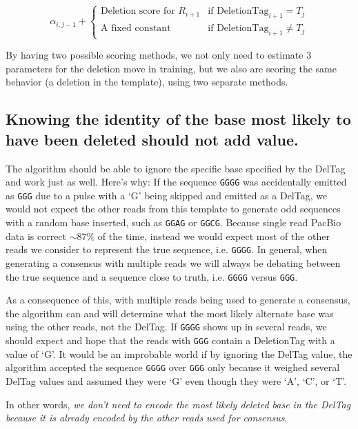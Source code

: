 \documentclass[fleqn,10pt]{SelfArx} %
\begin{document}
\[
	\alpha_{i,j-1}  +  \begin{cases}
							 \text{Deletion score  for } R_{i+1}  & \text{if }  \text{DeletionTag}_{i+1} = T_{j} \\
							 \text{A fixed constant} & \text{if }  \text{DeletionTag}_{i+1} \neq T_{j} 
							 \end{cases}
\]

By having two possible scoring methods, we not only need to estimate 3 parameters for the deletion move in training, but we also are scoring the same behavior (a deletion in the template), using two separate methods.

\subsection{Knowing the identity of the base most likely to have been deleted should not add value.}

The algorithm should be able to ignore the specific base specified by the DelTag and work just as well.  Here's why: If the sequence \texttt{GGGG} was accidentally emitted as \texttt{GGG} due to a pulse with a `G' being skipped and emitted as a DelTag, we would not expect the other reads from this template to generate odd sequences with a random base inserted,  such as \texttt{GGAG} or \texttt{GGCG}.  Because single read PacBio data is correct $\sim87\%$ of the time, instead we would expect most of the other reads we consider to represent the true sequence, i.e. \texttt{GGGG}.  In general, when generating a consensus with multiple reads we will always be debating between the true sequence and a sequence close to truth, i.e. \texttt{GGGG} versus \texttt{GGG}.

As a consequence of this, with multiple reads being used to generate a consensus, the algorithm can and will determine what the most likely alternate base was using the other reads, not the DelTag.  If \texttt{GGGG} shows up in several reads, we should expect and hope that the reads with \texttt{GGG} contain a DeletionTag with a value of `G'.  It would be an improbable world if by ignoring the DelTag value, the algorithm accepted the sequence \texttt{GGGG} over \texttt{GGG} only because it weighed several DelTag values and assumed they were `G' even though they were `A', `C', or `T'. 

In other words, \textit{we don't need to encode the most likely deleted base in the DelTag because it is already encoded by the other reads used for consensus}. 
 
\end{document}
